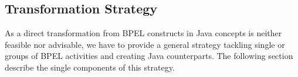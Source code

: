 \subsection{Transformation Strategy}
As a direct transformation from BPEL constructs in Java concepts is neither feasible nor advisable, we have to provide a general strategy tackling single or groups of BPEL activities and creating Java counterparts. The following section describe the single components of this strategy.

\subsubsection{}